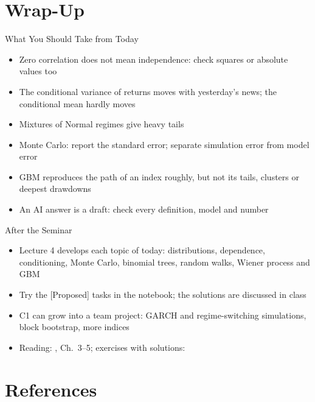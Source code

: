 \section{Wrap-Up}

\begin{frame}{What You Should Take from Today}
\itemsize{\small}
\begin{itemize}
    \item Zero correlation does not mean independence: check squares or absolute values too
    \item The conditional variance of returns moves with yesterday's news; the conditional mean hardly moves
    \item Mixtures of Normal regimes give heavy tails
    \item Monte Carlo: report the standard error; separate simulation error from model error
    \item GBM reproduces the path of an index roughly, but not its tails, clusters or deepest drawdowns
    \item An AI answer is a draft: check every definition, model and number
\end{itemize}
\end{frame}

\begin{frame}{After the Seminar}
\itemsize{\small}
\begin{itemize}
    \item Lecture 4 develops each topic of today: distributions, dependence, conditioning, Monte Carlo, binomial trees, random walks, Wiener process and GBM
    \item Try the [Proposed] tasks in the notebook; the solutions are discussed in class
    \item C1 can grow into a team project: GARCH and regime-switching simulations, block bootstrap, more indices
    \item Reading: , Ch.~3--5; exercises with solutions: 
\end{itemize}
\end{frame}


\section{References}

